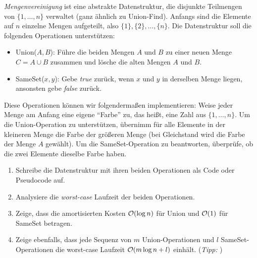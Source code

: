 \documentclass{uebung_cs}
\begin{document}
\begin{exercise}[Mengenvereinigung]
    \emph{Mengenvereinigung} ist eine abstrakte Datenstruktur, die disjunkte Teilmengen von $\{1,\dots,n\}$ verwaltet (ganz ähnlich zu Union-Find).
    Anfangs sind die Elemente auf $n$ einzelne Mengen aufgeteilt, also $\{1\}, \{2\}, \dots,\{n\}$.
    Die Datenstruktur soll die folgenden Operationen unterstützen:
    \begin{itemize}
        \item Union($A,B$): Führe die beiden Mengen $A$ und $B$ zu einer neuen Menge $C = A \cup B$ zusammen und lösche die alten Mengen $A$ und $B$.
        \item SameSet($x,y$): Gebe \textit{true} zurück, wenn $x$ und $y$ in derselben Menge liegen, ansonsten gebe \textit{false} zurück.
    \end{itemize}
    Diese Operationen können wir folgendermaßen implementieren: Weise jeder Menge am Anfang eine eigene \enquote{Farbe} zu, das heißt, eine Zahl aus $\{1,\dots,n\}$. Um die Union-Operation zu unterstützen, übernimm für alle Elemente in der kleineren Menge die Farbe der größeren Menge (bei Gleichstand wird die Farbe der Menge $A$ gewählt). Um die SameSet-Operation zu beantworten, überprüfe, ob die zwei Elemente dieselbe Farbe haben.

    \begin{enumerate}
        \item\athome Schreibe die Datenstruktur mit ihren beiden Operationen als Code oder Pseudocode auf.
        \item\athome Analysiere die \textit{worst-case} Laufzeit der beiden Operationen.
        \item\atschool\mittel Zeige, dass die amortisierten Kosten $\mathcal{O}(\log n)$ für Union und $\mathcal{O}(1)$ für SameSet betragen.
        \item\atschool\note Zeige ebenfalls, dass jede Sequenz von $m$ Union-Operationen und $l$ SameSet-Operationen die worst-case Laufzeit $\mathcal{O}(m \log n + l)$ einhält.
        (\emph{Tipp: })
    \end{enumerate}
\end{exercise}

\end{document}
